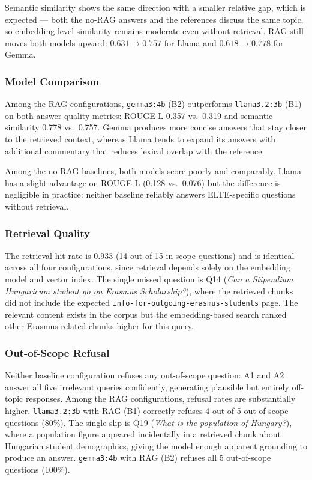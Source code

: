 Semantic similarity shows the same direction with a smaller relative gap,
which is expected --- both the no-RAG answers and the references discuss the
same topic, so embedding-level similarity remains moderate even without
retrieval. RAG still moves both models upward: $0.631 \to 0.757$ for Llama
and $0.618 \to 0.778$ for Gemma.
 
\subsubsection*{Model Comparison}
 
Among the RAG configurations, \texttt{gemma3:4b} (B2) outperforms
\texttt{llama3.2:3b} (B1) on both answer quality metrics: ROUGE-L 0.357
vs.\ 0.319 and semantic similarity 0.778 vs.\ 0.757. Gemma produces more
concise answers that stay closer to the retrieved context, whereas Llama
tends to expand its answers with additional commentary that reduces lexical
overlap with the reference.
 
Among the no-RAG baselines, both models score poorly and comparably. Llama
has a slight advantage on ROUGE-L (0.128 vs.\ 0.076) but the difference is
negligible in practice: neither baseline reliably answers ELTE-specific
questions without retrieval.
 
\subsubsection*{Retrieval Quality}
 
The retrieval hit-rate is 0.933 (14 out of 15 in-scope questions) and is
identical across all four configurations, since retrieval depends solely on
the embedding model and vector index. The single missed question is Q14
(\emph{Can a Stipendium Hungaricum student go on Erasmus Scholarship?}), where
the retrieved chunks did not include the expected
\texttt{info-for-outgoing-erasmus-students} page. The relevant content exists
in the corpus but the embedding-based search ranked other Erasmus-related
chunks higher for this query.
 
\subsubsection*{Out-of-Scope Refusal}
 
Neither baseline configuration refuses any out-of-scope question: A1 and A2
answer all five irrelevant queries confidently, generating plausible but
entirely off-topic responses. Among the RAG configurations, refusal rates are
substantially higher. \texttt{llama3.2:3b} with RAG (B1) correctly refuses 4
out of 5 out-of-scope questions (80\%). The single slip is Q19
(\emph{What is the population of Hungary?}), where a population figure
appeared incidentally in a retrieved chunk about Hungarian student demographics,
giving the model enough apparent grounding to produce an answer.
\texttt{gemma3:4b} with RAG (B2) refuses all 5 out-of-scope questions (100\%).
 
